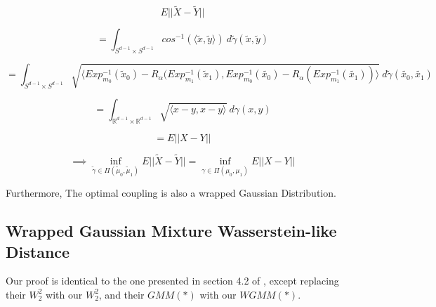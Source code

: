 \documentclass[]{article}
\begin{document}
\begin{equation*}
	E||\tilde{X}-\tilde{Y}||  
\end{equation*}  

\begin{equation*}
	= \int_{S^{d-1}\times S^{d-1}} cos^{-1}(\langle \tilde{x}, \tilde{y} \rangle) \ d\tilde{\gamma}(\tilde{x},\tilde{y})
\end{equation*}

\begin{equation*}
	= \int_{S^{d-1}\times S^{d-1}} \sqrt{\langle Exp_{m_0}^{-1}(\tilde{x}_0) - R_\alpha(Exp_{m_1}^{-1}(\tilde{x}_1), Exp_{m_0}^{-1}(\tilde{x_0}) - R_\alpha(Exp_{m_1}^{-1}(\tilde{x_1})) \rangle} \ d\tilde{\gamma}(\tilde{x_0},\tilde{x_1})
\end{equation*}


\begin{equation*}
	= \int_{\mathbb{R}^{d-1} \times \mathbb{R}^{d-1}} \sqrt{ \langle x - y, x-y\rangle} \ d\gamma(x,y)
\end{equation*}

\begin{equation*}
	= E||{X}-{Y}||  
\end{equation*}  

\begin{equation}
	\implies \inf_{\tilde{\gamma} \in \Pi(\tilde{\mu}_0, \tilde{\mu}_1)} E||\tilde{X}-\tilde{Y}||  = \inf_{\gamma \in \Pi({\mu}_0, {\mu}_1)} E||X-Y||
\end{equation}  


Furthermore, The optimal coupling is also a wrapped Gaussian Distribution. 

\subsection{Wrapped Gaussian Mixture Wasserstein-like Distance}

Our proof is identical to the one presented in section 4.2 of \cite{https://doi.org/10.48550/arxiv.1907.05254}, except replacing their $W_2^2$ with our $W_2^2$, and their $GMM(*)$ with our $WGMM(*)$. 




\newpage



\cite{https://doi.org/10.48550/arxiv.1907.05254}
\cite{https://doi.org/10.48550/arxiv.0801.2250}
\cite{10.1307/mmj/1029003026}
\cite{COTFNT}
\cite{Ambrosio2013}
\end{document}
